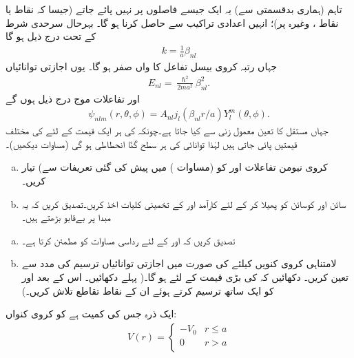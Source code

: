  تاہم (ہماری بدقسمتی سے) یہ ایک جیسے فاصلوں پر نہیں پائے جاتے  (جیسا کہ نقاط  یا نقاط ، وغیرہ پر)؛ انہیں اعدادی تراکیب سے حاصل کرنا ہو گا۔ بہرحال سرحدی شرط کے تحت درج ذیل ہو گا
\begin{align}
k=\frac{1}{a}\beta_{nl} 
\end{align}
جہاں  رتبہ     کروی بیسل تفاعل کا  واں صفر   ہو گا۔ یوں اجازتی توانائیاں 
\begin{align}\label{مساوات_ابعاد_کروی_کنواں_اجازتی_توانائیاں}
E_{nl}=\frac{\hslash^{2}}{2ma^{2}}\beta_{nl}^{2}. 
\end{align}
اور تفاعلات موج درج ذیل ہوں گے 
\begin{align}
\psi_{nlm}(r,\theta,\phi)=A_{nl}j_{l}(\beta_{nl}r/a)Y_{l}^{m}(\theta,\phi). 
\end{align}
جہاں مستقل  کا تعین معمول زنی سے کیا جاتا ہے۔چونکہ  کی ہر ایک قیمت کے لئے  کی 
مختلف قیمتیں پائی جاتی ہیں لہٰذا توانائی کی ہر سطح  گنّا انحطاطی ہو گی (مساوات  دیکھیں)۔
\begin{enumerate}[a.]
\item
کروی نیومن تفاعلات  اور  کو (مساوات ) میں پیش کی گئی تعریفات سے)  تیار کریں۔
\item
سائن اور کوسائن کو پھیلا کر  کے لئے كارآمد   اور  کے  تخمینی کلیات  اخذ کریں۔تصدیق کریں کہ یہ مبدا پر بےقابو بڑھتے ہیں۔
\end{enumerate}
%
\begin{enumerate}[a.]
\item
 تصدیق کریں کہ  اور  کے لئے  رداسی مساوات کو مطمئن کرتا ہے۔
\item
لامتناہی کروی کنویں  کیلئے  کی صورت میں اجازتی توانائیاں ترسیم کی مدد سے تعین کریں۔ دکھائیں کہ  کی بڑی قیمت کے لئے 
 ہو گا۔( پہلے  
 دکھائیں۔ اس کے بعد  اور  کو ایک ساتھ ترسیم کرتے ہوئے ان کے نقاط تقاطع تلاش کریں۔)
\end{enumerate}
%
 ایک ذرہ جس کی کمیت  ہے کو  کروی کنواں:
\begin{align*}
V(r)=\begin{cases}-V_{0}&r\le a\\0&r>a\\\end{cases} 
\end{align*}
